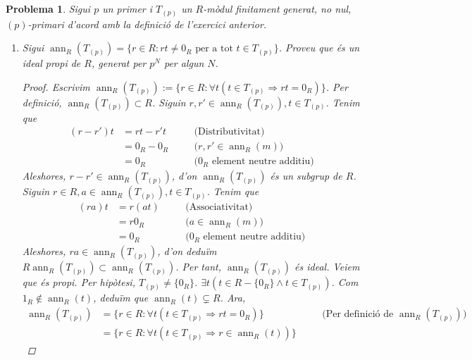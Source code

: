 \documentclass[compress]{article}
\newtheorem{problema}{Problema}
\theoremstyle{definition}
\DeclareMathOperator{\ann}{ann}
\begin{document}
\begin{problema}
    Sigui $p$ un primer i $T_{(p)}$ un $R$-mòdul finitament generat, no nul, $(p)$-primari d'acord amb la definició de l'exercici anterior.
    \begin{enumerate}
        \item Sigui $\ann_{R}(T_{(p)})=\{r\in R:rt\neq0_{R}\textrm{ per a tot }t\in T_{(p)}\}$. Proveu que és un ideal propi de $R$, generat per $p^{N}$ per algun $N$.
        \begin{proof}
            Escrivim $\ann_{R}(T_{(p)}):=\{r\in R:\forall t(t\in T_{(p)}\Rightarrow rt=0_{R})\}$. Per definició, $\ann_{R}(T_{(p)})\subset R$. Siguin $r,r'\in\ann_{R}(T_{(p)}),t\in T_{(p)}$. Tenim que
            \begin{align*}
                (r-r')t
                &=rt-r't
                &\quad&\textrm{(Distributivitat)}\\
                &=0_{R}-0_{R}
                &\quad&\textrm{($r,r'\in\ann_{R}(m)$)}\\
                &=0_{R}
                &\quad&\textrm{($0_{R}$ element neutre additiu)}
            \end{align*}
            Aleshores, $r-r'\in\ann_{R}(T_{(p)})$, d'on $\ann_{R}(T_{(p)})$ és un subgrup de $R$. Siguin $r\in R,a\in\ann_{R}(T_{(p)}),t\in T_{(p)}$. Tenim que
            \begin{align*}
                (ra)t
                &=r(at)
                &\quad&\textrm{(Associativitat)}\\
                &=r0_{R}
                &\quad&\textrm{($a\in\ann_{R}(m)$)}\\
                &=0_{R}
                &\quad&\textrm{($0_{R}$ element neutre additiu)}
            \end{align*}
            Aleshores, $ra\in\ann_{R}(T_{(p)})$, d'on deduïm $R\ann_{R}(T_{(p)})\subset\ann_{R}(T_{(p)})$. Per tant, $\ann_{R}(T_{(p)})$ és ideal.\newline
            Veiem que és propi. Per hipòtesi, $T_{(p)}\neq\{0_{R}\}$. $\exists t(t\in R-\{0_{R}\}\land t\in T_{(p)})$. Com $1_{R}\notin\ann_{R}(t)$, deduïm que $\ann_{R}(t)\subsetneq R$. Ara,
            \begin{align*}
                \ann_{R}(T_{(p)})
                &=\{r\in R:\forall t(t\in T_{(p)}\Rightarrow rt=0_{R})\}
                &\quad&\textrm{(Per definició de $\ann_{R}(T_{(p)})$)}\\
                &=\{r\in R:\forall t(t\in T_{(p)}\Rightarrow r\in\ann_{R}(t))\}

\end{align*}
\end{proof}
\end{enumerate}
\end{problema}
\end{document}
